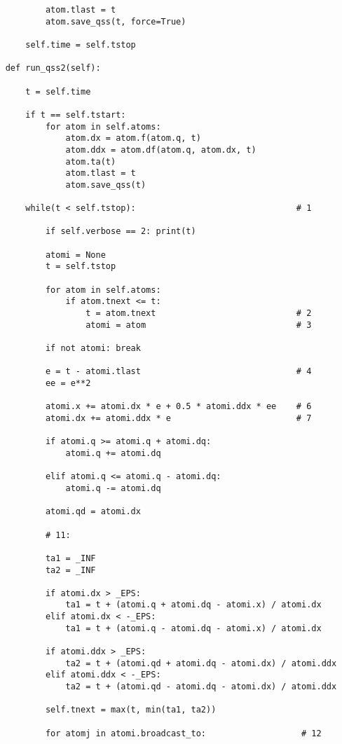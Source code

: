 \begin{lstlisting}
            atom.tlast = t
            atom.save_qss(t, force=True)

        self.time = self.tstop

    def run_qss2(self):

        t = self.time

        if t == self.tstart:
            for atom in self.atoms:
                atom.dx = atom.f(atom.q, t)
                atom.ddx = atom.df(atom.q, atom.dx, t)
                atom.ta(t)
                atom.tlast = t
                atom.save_qss(t)

        while(t < self.tstop):                                # 1

            if self.verbose == 2: print(t)

            atomi = None
            t = self.tstop

            for atom in self.atoms:
                if atom.tnext <= t:
                    t = atom.tnext                            # 2
                    atomi = atom                              # 3

            if not atomi: break

            e = t - atomi.tlast                               # 4
            ee = e**2

            atomi.x += atomi.dx * e + 0.5 * atomi.ddx * ee    # 6
            atomi.dx += atomi.ddx * e                         # 7

            if atomi.q >= atomi.q + atomi.dq:
                atomi.q += atomi.dq

            elif atomi.q <= atomi.q - atomi.dq:
                atomi.q -= atomi.dq

            atomi.qd = atomi.dx

            # 11:

            ta1 = _INF
            ta2 = _INF

            if atomi.dx > _EPS:
                ta1 = t + (atomi.q + atomi.dq - atomi.x) / atomi.dx
            elif atomi.dx < -_EPS:
                ta1 = t + (atomi.q - atomi.dq - atomi.x) / atomi.dx

            if atomi.ddx > _EPS:
                ta2 = t + (atomi.qd + atomi.dq - atomi.dx) / atomi.ddx
            elif atomi.ddx < -_EPS:
                ta2 = t + (atomi.qd - atomi.dq - atomi.dx) / atomi.ddx

            self.tnext = max(t, min(ta1, ta2))

            for atomj in atomi.broadcast_to:                   # 12


\end{lstlisting}
